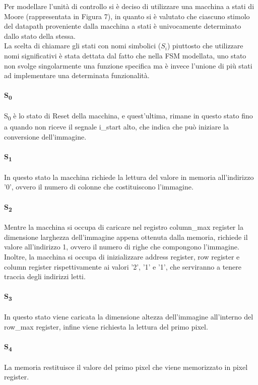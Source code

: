 Per modellare l'unità di controllo si è deciso di utilizzare una macchina a stati di Moore (rappresentata in Figura 7), in quanto si è valutato che ciascuno stimolo del datapath proveniente dalla macchina a stati è univocamente determinato dallo stato della stessa.\\
La scelta di chiamare gli stati con nomi simbolici ($S_i$) piuttosto che utilizzare nomi significativi è stata dettata dal fatto che nella FSM modellata, uno stato non svolge singolarmente una funzione specifica ma è invece l'unione di più stati ad implementare una determinata funzionalità.

\newpage

\paragraph{S\textsubscript{0}}
S\textsubscript{0} è lo stato di Reset della macchina, e quest'ultima, rimane in questo stato fino a quando non riceve il segnale i\_start alto, che indica che può iniziare la conversione dell'immagine.
\paragraph{S\textsubscript{1}}
In questo stato la macchina richiede la lettura del valore in memoria all'indirizzo '0', ovvero il numero di colonne che costituiscono l'immagine.
\paragraph{S\textsubscript{2}}
Mentre la macchina si occupa di caricare nel registro column\_max register la dimensione larghezza dell'immagine appena ottenuta dalla memoria, richiede il valore all'indirizzo 1, ovvero il numero di righe che compongono l'immagine. Inoltre, la macchina si occupa di inizializzare address register, row register e column register rispettivamente ai valori '2', '1' e '1', che serviranno a tenere traccia degli indirizzi letti.
\paragraph{S\textsubscript{3}}
In questo stato viene caricata la dimensione altezza dell'immagine all'interno del row\_max register, infine viene richiesta la lettura del primo pixel.
\paragraph{S\textsubscript{4}}
La memoria restituisce il valore del primo pixel che viene memorizzato in pixel register.

